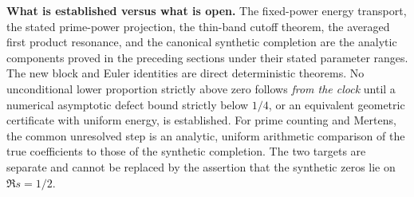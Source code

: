 \documentclass[11pt,reqno]{amsart}
\numberwithin{equation}{section}
\begin{document}
\medskip
\noindent\textbf{What is established versus what is open.}
The fixed-power energy transport, the stated prime-power projection,
the thin-band cutoff theorem, the averaged first product resonance,
and the canonical synthetic completion are the analytic components
proved in the preceding sections under their stated parameter ranges.
The new block and Euler identities are direct deterministic theorems.
No unconditional lower proportion strictly above zero follows
\emph{from the clock} until a numerical asymptotic defect bound
strictly below $1/4$, or an equivalent geometric certificate with
uniform energy, is established.  For prime counting and Mertens,
the common unresolved step is an analytic, uniform arithmetic
comparison of the true coefficients to those of the synthetic
completion. The two targets are separate and cannot be replaced
by the assertion that the synthetic zeros lie on $\Re s=1/2$.
\end{document}
